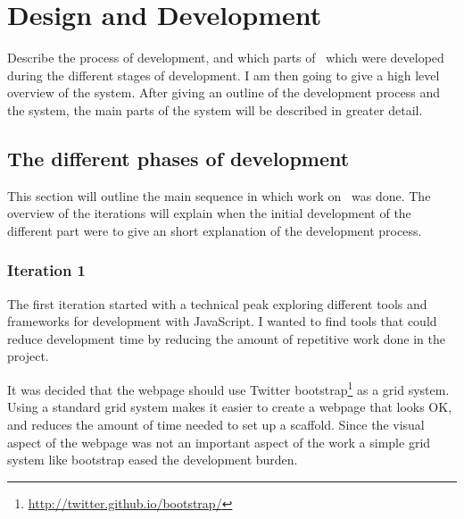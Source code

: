 
\chapter{Design and Development} %

\label{DesignAndDevelopment} %



Describe the process of development,
and which parts of \theartefact\ which were developed during the different stages of development.
I am then going to give a high level overview of the system.
After giving an outline of the development process and the system,
the main parts of the system will be described in greater detail.

\section{The different phases of development}
This section will outline the main sequence in which work on \theartefact\ was done.
The overview of the iterations will explain when the initial development of
the different part were to give an short explanation of the development process.

\subsection{Iteration 1}
The first iteration started with a technical peak exploring different tools and frameworks for development with JavaScript.
I wanted to find tools that could reduce development time by reducing the amount of repetitive work done in the project.

It was decided that the webpage should use Twitter bootstrap\footnote{\url{http://twitter.github.io/bootstrap/}} as a grid system.
Using a standard grid system makes it easier to create a webpage that looks OK,
and reduces the amount of time needed to set up a scaffold.
Since the visual aspect of the webpage was not an important aspect of the work a simple grid system like bootstrap
eased the development burden.

